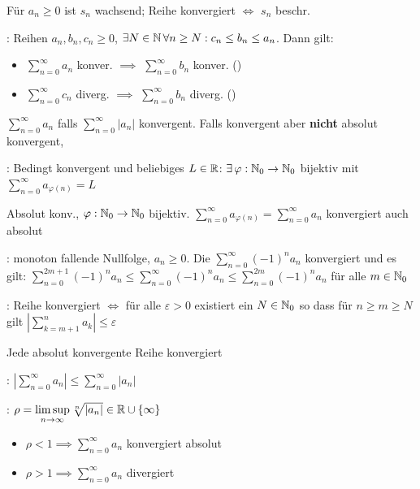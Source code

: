 \Satz Für $a_n\ge 0$ ist $s_n$ wachsend; Reihe konvergiert $\iff$ $s_n$ beschr.

\Satz {}: Reihen $a_n, b_n, c_n\ge 0$,
$\exists N \in \mathbb{N} \, \forall n\ge N : c_n\le b_n\le a_n$. Dann gilt:
\vspace{-0.6em}
\begin{itemize}
    \item $\sum_{n=0}^{\infty} a_n$ konver. $\implies$ $\sum_{n=0}^{\infty} b_n$ konver. ()
    \item $\sum_{n=0}^{\infty} c_n$ diverg. $\implies$ $\sum_{n=0}^{\infty} b_n$ diverg. ()
\end{itemize}

\Def $\sum_{n=0}^{\infty} a_n$  falls $\sum_{n=0}^{\infty} |a_n|$ konvergent.
Falls konvergent aber \textbf{nicht} absolut konvergent, 

\Satz {}: Bedingt konvergent und beliebiges $L \in \mathbb{R}$:
$\exists \, \varphi: \mathbb{N}_0 \to \mathbb{N}_0$ bijektiv mit $\sum_{n=0}^{\infty} a_{\varphi(n)} = L$

\Satz {} Absolut konv., $\varphi: \mathbb{N}_0 \to \mathbb{N}_0$ bijektiv.
$\sum_{n=0}^{\infty} a_{\varphi(n)} = \sum_{n=0}^{\infty} a_n$ konvergiert auch absolut

\Satz {}: monoton fallende Nullfolge, $a_n \ge 0$.
Die  $\sum_{n=0}^{\infty} (-1)^n a_n$ konvergiert und es gilt:
$\sum_{n=0}^{2m+1} (-1)^n a_n\le \sum_{n=0}^{\infty} (-1)^n a_n\le \sum_{n=0}^{2m} (-1)^n a_n$ für alle $m \in \mathbb{N}_0$

\Satz {}: Reihe konvergiert $\iff$ für alle $\varepsilon > 0$ existiert ein $N \in \mathbb{N}_0$ so dass für $n\ge m\ge N$ gilt $|\sum_{k = m+1}^{n} a_k|\le \varepsilon$

\Satz Jede absolut konvergente Reihe konvergiert

\Satz {}: $\left|\sum\limits_{n=0}^{\infty} a_n \right|\le \sum\limits_{n=0}^{\infty}|a_n|$

\Satz {}: $\rho = \limsup\limits_{n\to\infty} \sqrt[n]{|a_n|} \in \mathbb{R} \cup \{\infty\}$
\vspace{-0.6em}
\begin{itemize}
    \item $\rho < 1 \implies \sum_{n=0}^{\infty} a_n$ konvergiert absolut
    \item $\rho > 1 \implies \sum_{n=0}^{\infty} a_n$ divergiert
\end{itemize}

